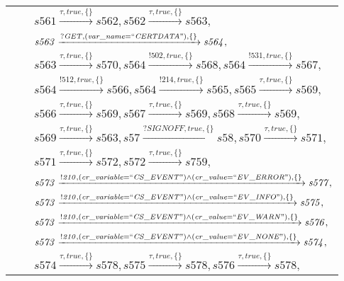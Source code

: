 \begin{tabular}{lcp{350px}}
& & $\mathit{s561}\xrightarrow{\mathit{\tau}, \mathit{true}, \{\}}\mathit{s562},\mathit{s562}\xrightarrow{\mathit{\tau}, \mathit{true}, \{\}}\mathit{s563},$ \\
& & $\mathit{s563}\xrightarrow{\mathit{?GET}, \mathit{(var\_name = ``CERTDATA")}, \{\}}\mathit{s564},$ \\
& & $\mathit{s563}\xrightarrow{\mathit{\tau}, \mathit{true}, \{\}}\mathit{s570},\mathit{s564}\xrightarrow{\mathit{!502}, \mathit{true}, \{\}}\mathit{s568},\mathit{s564}\xrightarrow{\mathit{!531}, \mathit{true}, \{\}}\mathit{s567},$ \\
& & $\mathit{s564}\xrightarrow{\mathit{!512}, \mathit{true}, \{\}}\mathit{s566},\mathit{s564}\xrightarrow{\mathit{!214}, \mathit{true}, \{\}}\mathit{s565},\mathit{s565}\xrightarrow{\mathit{\tau}, \mathit{true}, \{\}}\mathit{s569},$ \\
& & $\mathit{s566}\xrightarrow{\mathit{\tau}, \mathit{true}, \{\}}\mathit{s569},\mathit{s567}\xrightarrow{\mathit{\tau}, \mathit{true}, \{\}}\mathit{s569},\mathit{s568}\xrightarrow{\mathit{\tau}, \mathit{true}, \{\}}\mathit{s569},$ \\
& & $\mathit{s569}\xrightarrow{\mathit{\tau}, \mathit{true}, \{\}}\mathit{s563},\mathit{s57}\xrightarrow{\mathit{?SIGNOFF}, \mathit{true}, \{\}}\mathit{s58},\mathit{s570}\xrightarrow{\mathit{\tau}, \mathit{true}, \{\}}\mathit{s571},$ \\
& & $\mathit{s571}\xrightarrow{\mathit{\tau}, \mathit{true}, \{\}}\mathit{s572},\mathit{s572}\xrightarrow{\mathit{\tau}, \mathit{true}, \{\}}\mathit{s759},$ \\
& & $\mathit{s573}\xrightarrow{\mathit{!210}, \mathit{(cr\_variable = ``CS\_EVENT") \land (cr\_value = ``EV\_ERROR")}, \{\}}\mathit{s577},$ \\
& & $\mathit{s573}\xrightarrow{\mathit{!210}, \mathit{(cr\_variable = ``CS\_EVENT") \land (cr\_value = ``EV\_INFO")}, \{\}}\mathit{s575},$ \\
& & $\mathit{s573}\xrightarrow{\mathit{!210}, \mathit{(cr\_variable = ``CS\_EVENT") \land (cr\_value = ``EV\_WARN")}, \{\}}\mathit{s576},$ \\
& & $\mathit{s573}\xrightarrow{\mathit{!210}, \mathit{(cr\_variable = ``CS\_EVENT") \land (cr\_value = ``EV\_NONE")}, \{\}}\mathit{s574},$ \\
& & $\mathit{s574}\xrightarrow{\mathit{\tau}, \mathit{true}, \{\}}\mathit{s578},\mathit{s575}\xrightarrow{\mathit{\tau}, \mathit{true}, \{\}}\mathit{s578},\mathit{s576}\xrightarrow{\mathit{\tau}, \mathit{true}, \{\}}\mathit{s578},$ \\

\end{tabular}
